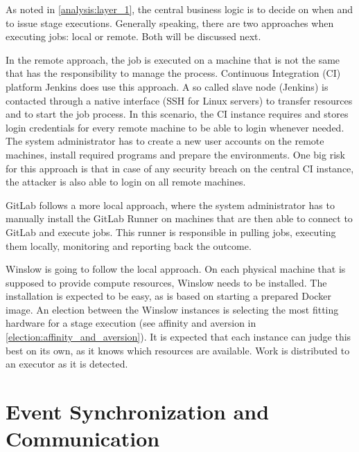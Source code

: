 As noted in \autoref{analysis:layer_1}, the central business logic is to decide on when and to issue stage executions.
Generally speaking, there are two approaches when executing jobs: local or remote. Both will be discussed next.

In the remote approach, the job is executed on a machine that is not the same that has the responsibility to manage the process.
Continuous Integration (CI) platform Jenkins\cite{jenkins:main} does use this approach.
A so called slave node (Jenkins) is contacted through a native interface (SSH for Linux servers) to transfer resources and to start the job process.
In this scenario, the CI instance requires and stores login credentials for every remote machine to be able to login whenever needed.
The system administrator has to create a new user accounts on the remote machines, install required programs and prepare the environments.
One big risk for this approach is that in case of any security breach on the central CI instance, the attacker is also able to login on all remote machines.

GitLab\cite{gitlab:main} follows a more local approach, where the system administrator has to manually install the GitLab Runner on machines that are then able to connect to GitLab and execute jobs.
This runner is responsible in pulling jobs, executing them locally, monitoring and reporting back the outcome.

Winslow is going to follow the local approach.
On each physical machine that is supposed to provide compute resources, Winslow needs to be installed.
The installation is expected to be easy, as is based on starting a prepared Docker image.
An election between the Winslow instances is selecting the most fitting hardware for a stage execution (see affinity and aversion in \autoref{election:affinity_and_aversion}).
It is expected that each instance can judge this best on its own, as it knows which resources are available.
Work is distributed to an executor as it is detected.



\section{Event Synchronization and Communication}
\label{design:synchronization}

